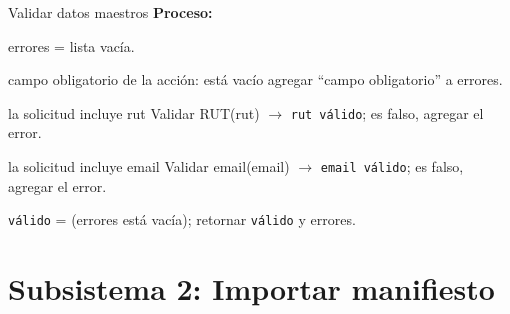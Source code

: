 \begin{modspec}{Validar datos maestros}
\textbf{Proceso:}
\begin{logica}
    \item errores = lista vacía.
    \item {} campo obligatorio de la acción:  está vacío 
    agregar ``campo obligatorio'' a errores.
    \item {} la solicitud incluye rut  Validar RUT(rut) $\rightarrow$
    \texttt{rut válido};  es falso, agregar el error.
    \item {} la solicitud incluye email  Validar email(email)
    $\rightarrow$ \texttt{email válido};  es falso, agregar el error.
    \item \texttt{válido} = (errores está vacía); retornar \texttt{válido} y errores.
\end{logica}
\end{modspec}

\section{Subsistema 2: Importar manifiesto}

